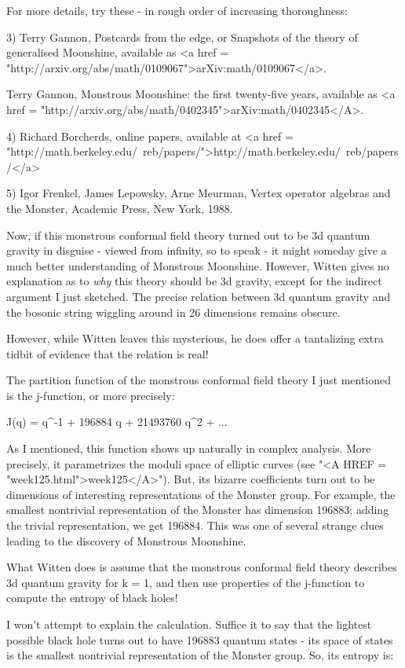 For more details, try these - in rough order of increasing 
thoroughness:

3) Terry Gannon, Postcards from the edge, or Snapshots 
of the theory of generalised Moonshine, available as 
<a href = "http://arxiv.org/abs/math/0109067">arXiv:math/0109067</a>.

Terry Gannon, Monstrous Moonshine: the first twenty-five years,
available as <a href =
"http://arxiv.org/abs/math/0402345">arXiv:math/0402345</A>.

4) Richard Borcherds, online papers, available at <a href =
"http://math.berkeley.edu/~reb/papers/">http://math.berkeley.edu/~reb/papers/</a>

5) Igor Frenkel, James Lepowsky, Arne Meurman, Vertex operator 
algebras and the Monster, Academic Press, New York, 1988.

Now, if this monstrous conformal field theory turned out to be 
3d quantum gravity in disguise - viewed from infinity, so to 
speak - it might someday give a much better understanding of 
Monstrous Moonshine.  However, Witten gives no explanation as to 
\emph{why} this theory should be 3d gravity, except for the indirect 
argument I just sketched.  The precise relation between 3d 
quantum gravity and the bosonic string wiggling around in 
26 dimensions remains obscure.

However, while Witten leaves this mysterious, he does offer a 
tantalizing extra tidbit of evidence that the relation is real!

The partition function of the monstrous conformal field theory 
I just mentioned is the j-function, or more precisely:

J(q) = q^{-1} + 196884 q + 21493760 q^{2} + ...

As I mentioned, this function shows up naturally in complex analysis.
More precisely, it parametrizes the moduli space of elliptic curves
(see "<A HREF = "week125.html">week125</A>").  But, its
bizarre coefficients turn out to be dimensions of interesting
representations of the Monster group.  For example, the smallest
nontrivial representation of the Monster has dimension 196883; adding
the trivial representation, we get 196884.  This was one of several
strange clues leading to the discovery of Monstrous Moonshine.

What Witten does is assume that the monstrous conformal field 
theory describes 3d quantum gravity for k = 1, and then use
properties of the j-function to compute the entropy of black 
holes!

I won't attempt to explain the calculation.  Suffice it to say 
that the lightest possible black hole turns out to have 
196883 quantum states - its space of states is the smallest
nontrivial representation of the Monster group.  So, its entropy
is:

